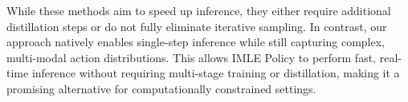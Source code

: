 While these methods aim to speed up inference, they either require additional distillation steps or do not fully eliminate iterative sampling. In contrast, our approach natively enables single-step inference while still capturing complex, multi-modal action distributions. This allows IMLE Policy to perform fast, real-time inference without requiring multi-stage training or distillation, making it a promising alternative for computationally constrained settings.

